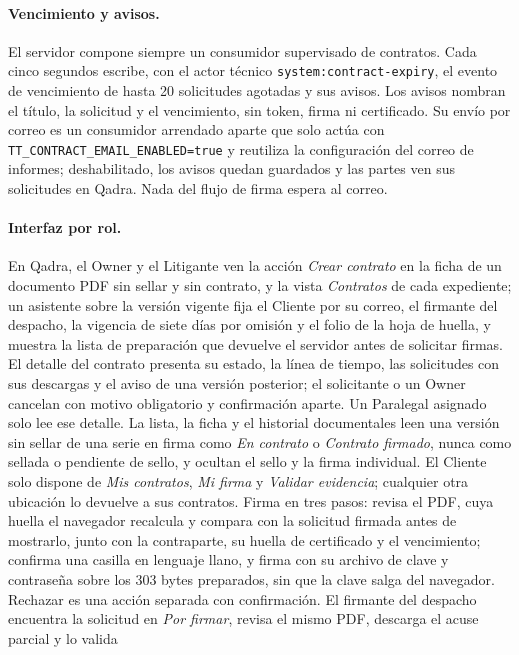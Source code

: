 \paragraph{Vencimiento y avisos.} El servidor compone siempre un consumidor
supervisado de contratos. Cada cinco segundos escribe, con el actor técnico
\texttt{system:contract-expiry}, el evento de vencimiento de hasta 20
solicitudes agotadas y sus avisos. Los avisos nombran el título, la solicitud y
el vencimiento, sin token, firma ni certificado. Su envío por correo es un
consumidor arrendado aparte que solo actúa con
\texttt{TT\_CONTRACT\_EMAIL\_ENABLED=true} y reutiliza la configuración del
correo de informes; deshabilitado, los avisos quedan guardados y las partes
ven sus solicitudes en Qadra. Nada del flujo de firma espera al correo.

\paragraph{Interfaz por rol.} En Qadra, el Owner y el Litigante ven la acción
\emph{Crear contrato} en la ficha de un documento PDF sin sellar y sin
contrato, y la vista \emph{Contratos} de cada expediente; un asistente sobre
la versión vigente fija el Cliente por su correo, el firmante del despacho, la
vigencia de siete días por omisión y el folio de la hoja de huella, y muestra
la lista de preparación que devuelve el servidor antes de solicitar firmas. El detalle del contrato
presenta su estado, la línea de tiempo, las solicitudes con sus descargas y el
aviso de una versión posterior; el solicitante o un Owner cancelan con motivo
obligatorio y confirmación aparte. Un Paralegal asignado solo lee ese detalle.
La lista, la ficha y el historial documentales leen una versión sin sellar de
una serie en firma como \emph{En contrato} o \emph{Contrato firmado}, nunca como
sellada o pendiente de sello, y ocultan el sello y la firma individual. El
Cliente solo dispone de \emph{Mis contratos}, \emph{Mi firma} y
\emph{Validar evidencia}; cualquier otra ubicación lo devuelve a sus contratos.
Firma en tres pasos: revisa el PDF, cuya huella el navegador recalcula y
compara con la solicitud firmada antes de mostrarlo, junto con la contraparte,
su huella de certificado y el vencimiento; confirma una casilla en lenguaje
llano, y firma con su archivo de clave y contraseña sobre los 303 bytes
preparados, sin que la clave salga del navegador. Rechazar es una acción
separada con confirmación. El firmante del despacho encuentra la solicitud en
\emph{Por firmar}, revisa el mismo PDF, descarga el acuse parcial y lo valida
